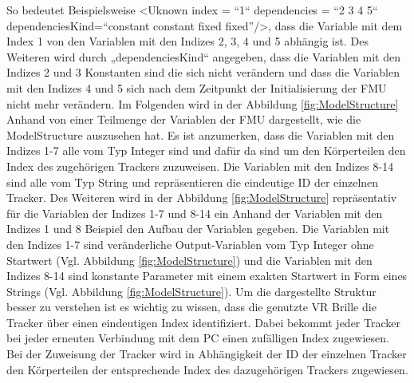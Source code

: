 So bedeutet Beispielsweise <Uknown index  = “1“ dependencies = “2 3 4 5“ dependenciesKind=“constant constant fixed fixed”/>, dass die Variable mit dem Index 1 von den Variablen mit den Indizes 2, 3, 4 und 5 abhängig ist. Des Weiteren wird durch „dependenciesKind“ angegeben, dass die Variablen mit den Indizes 2 und 3 Konstanten sind die sich nicht verändern und dass die Variablen mit den Indizes 4 und 5 sich nach dem Zeitpunkt der Initialisierung der FMU nicht mehr verändern.
\newline\newline
Im Folgenden wird in der Abbildung \ref{fig:ModelStructure} Anhand von einer Teilmenge der Variablen der FMU dargestellt, wie die ModelStructure auszusehen hat. Es ist anzumerken, dass die Variablen mit den Indizes 1-7 alle vom Typ Integer sind und dafür da sind um den Körperteilen den Index des zugehörigen Trackers zuzuweisen. Die Variablen mit den Indizes 8-14 sind alle vom Typ String und repräsentieren die eindeutige ID der einzelnen Tracker. Des Weiteren wird in der Abbildung \ref{fig:ModelStructure} repräsentativ für die Variablen der Indizes 1-7 und 8-14 ein Anhand der Variablen mit den Indizes 1 und 8 Beispiel den Aufbau der Variablen gegeben. Die Variablen mit den Indizes 1-7 sind veränderliche Output-Variablen vom Typ Integer ohne Startwert (Vgl. Abbildung \ref{fig:ModelStructure}) und die Variablen mit den Indizes 8-14 sind konstante Parameter mit einem exakten Startwert in Form eines Strings (Vgl. Abbildung \ref{fig:ModelStructure}). Um die dargestellte Struktur besser zu verstehen ist es wichtig zu wissen, dass die genutzte VR Brille die Tracker über einen eindeutigen Index identifiziert. Dabei bekommt jeder Tracker bei jeder erneuten Verbindung mit dem PC einen zufälligen Index zugewiesen. Bei der Zuweisung der Tracker wird in Abhängigkeit der ID der einzelnen Tracker den Körperteilen der entsprechende Index des dazugehörigen Trackers zugewiesen.
